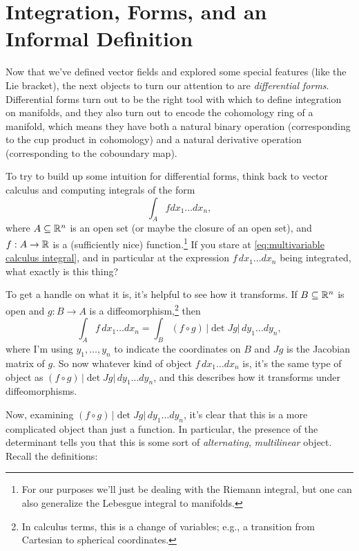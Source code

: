 
\section{Integration, Forms, and an Informal Definition}

Now that we've defined vector fields and explored some special features (like the Lie bracket), the next objects to turn our attention to are \emph{differential forms}. Differential forms turn out to be the right tool with which to define integration on manifolds, and they also turn out to encode the cohomology ring of a manifold, which means they have both a natural binary operation (corresponding to the cup product in cohomology) and a natural derivative operation (corresponding to the coboundary map).

To try to build up some intuition for differential forms, think back to vector calculus and computing integrals of the form
\begin{equation}\label{eq:multivariable calculus integral}
	\int_A f dx_1 \dots dx_n,
\end{equation}
where $A \subseteq \mathbb{R}^n$ is an open set (or maybe the closure of an open set), and $f: A \to \mathbb{R}$ is a (sufficiently nice) function.\footnote{For our purposes we'll just be dealing with the Riemann integral, but one can also generalize the Lebesgue integral to manifolds.} If you stare at \eqref{eq:multivariable calculus integral}, and in particular at the expression $f\, dx_1 \dots dx_n$ being integrated, what exactly is this thing?

To get a handle on what it is, it's helpful to see how it transforms. If $B \subseteq \mathbb{R}^n$ is open and $g: B \to A$ is a diffeomorphism,\footnote{In calculus terms, this is a change of variables; e.g., a transition from Cartesian to spherical coordinates.} then
\[
	\int_A f\, dx_1 \dots dx_n = \int_B (f \circ g) \,|\!\det Jg|\, dy_1 \dots dy_n,
\]
where I'm using $y_1, \dots , y_n$ to indicate the coordinates on $B$ and $Jg$ is the Jacobian matrix of $g$. So now whatever kind of object $f\, dx_1 \dots dx_n$ is, it's the same type of object as $(f \circ g) \,|\!\det Jg|\, dy_1 \dots dy_n$, and this describes how it transforms under diffeomorphisms.

Now, examining $(f \circ g)\, |\!\det Jg|\, dy_1 \dots dy_n$, it's clear that this is a more complicated object than just a function. In particular, the presence of the determinant tells you that this is some sort of \emph{alternating}, \emph{multilinear} object. Recall the definitions:

